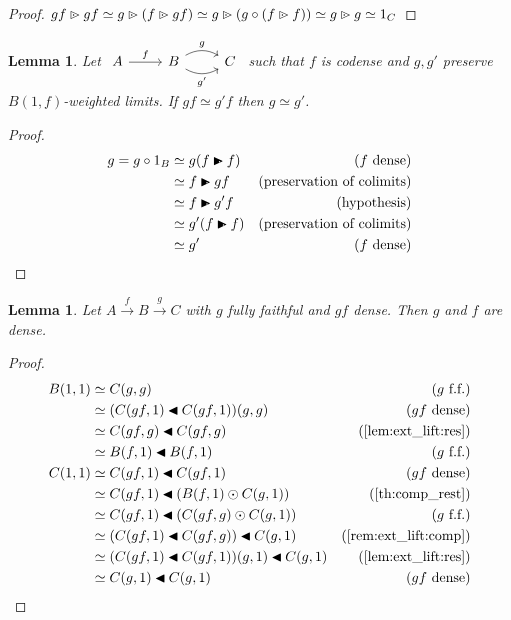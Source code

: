 \documentclass[10pt,a4paper]{article}
\newcommand{\plext}{\mathbin{{\rhd}\mathclap{\mspace{-17.5mu}\cdot}}}
\newcommand{\prext}{\mathbin{{\blacktriangleright}\mathclap{\mspace{-10.5mu}\raisebox{-0.45pt}{\textcolor{white}{$\cdot$}}}}}
\newcommand{\rift}{\mathbin{\blacktriangleleft}}
\theoremstyle{plain}
\newtheorem{lemma}[theorem]{Lemma}
\theoremstyle{definition}
\theoremstyle{remark}
\begin{document}
\begin{proof}
    $gf \plext gf \simeq g\plext(f\plext gf) \simeq g\plext(g\circ(f\plext f)) \simeq g\plext g \simeq 1_C$
\end{proof}

\begin{lemma}
    \label{lem:codense_lim_equiv}
    Let $\begin{tikzcd} A \ar[r, "f"] & B \ar[r, "g", bend left] \ar[r, "g'"', bend right] & C\end{tikzcd}$ such that $f$ is codense and $g, g'$ preserve $B(1, f)$-weighted limits. If $gf \simeq g'f$ then $g\simeq g'$.
\end{lemma}

\begin{proof}
    \begin{align*}
        g = g\circ 1_B &\simeq g(f\prext f) & (f \text{ dense})\\
                       &\simeq f \prext gf & (\text{preservation of colimits})\\
                       &\simeq f \prext g'f & (\text{hypothesis})\\
                       &\simeq g'(f\prext f) & (\text{preservation of colimits})\\
                       &\simeq g' & (f \text{ dense})
    \end{align*}
\end{proof}

\begin{lemma}
    \label{lem:ff_comp_dense}
    Let $A \xrightarrow{f} B \xrightarrow{g} C$ with $g$ fully faithful and $gf$ dense. Then $g$ and $f$ are dense.
\end{lemma}

\begin{proof}
    \begin{align*}
        B(1, 1) &\simeq C(g, g) & (g\text{ f.f.})\\
                &\simeq (C(gf, 1) \rift C(gf, 1))(g, g) & (gf\text{ dense})\\
                &\simeq C(gf, g)\rift C(gf, g) & (\ref{lem:ext_lift:res})\\
                &\simeq B(f, 1)\rift B(f, 1) & (g\text{ f.f.})\\
        C(1, 1) &\simeq C(gf, 1)\rift C(gf, 1) & (gf\text{ dense})\\
                &\simeq C(gf, 1)\rift (B(f, 1)\odot C(g, 1)) & (\ref{th:comp_rest})\\
                &\simeq C(gf, 1)\rift (C(gf, g)\odot C(g, 1)) & (g\text{ f.f.})\\
                &\simeq (C(gf, 1)\rift C(gf, g))\rift C(g, 1) & (\ref{rem:ext_lift:comp})\\
                &\simeq (C(gf, 1)\rift C(gf, 1))(g, 1)\rift C(g, 1) & (\ref{lem:ext_lift:res})\\
                &\simeq C(g, 1)\rift C(g, 1) & (gf\text{  dense})
    \end{align*}
\end{proof}
\end{document}
